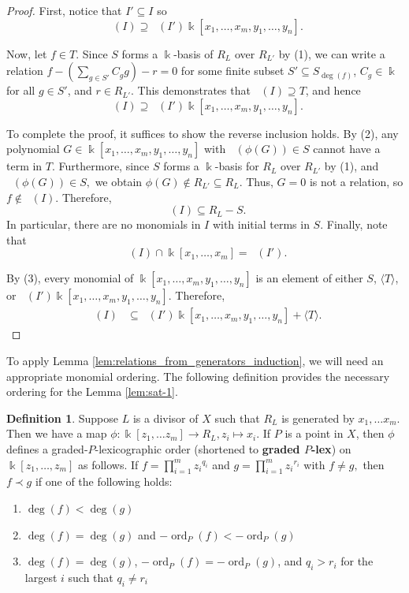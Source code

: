 \documentclass{amsart}
\theoremstyle{plain}
\theoremstyle{definition}
\newtheorem{defn}[thm]{Definition}
\theoremstyle{remark}
\numberwithin{equation}{section}
\newcommand\Bk{{\Bbbk}}
\DeclareMathOperator{\ord}{ord}
\newcommand{\halfcan}{L}
\DeclareMathOperator{\initial}{in_\prec}
\begin{document}
\begin{proof}
First, notice that $I'\subseteq I$ so 
\[
	\initial(I)\supseteq \initial(I')\Bk[x_1, \ldots, x_m, y_1, \ldots, y_n].
\]

Now, let $f\in T$.  Since $S$ forms a $\Bk$-basis of $R_{\halfcan}$ over $R_{\halfcan'}$ by (1), we can write a relation $f - (\sum_{g\in S'} C_g g)-r=0$ for some finite subset $S'\subseteq S_{\deg(f)}$, $C_g\in \Bk$ for all $g\in S'$, and $r\in R_{\halfcan'}$.  This demonstrates that $\initial(I) \supseteq T$, and hence
\[
	\initial(I)\supseteq \initial(I')\Bk[x_1, \ldots, x_m, y_1, \ldots, y_n].
\]

To complete the proof, it suffices to show the reverse inclusion holds. By (2), any polynomial $G\in \Bk[x_1, \ldots, x_m, y_1, \ldots, y_n]$ with $\initial(\phi(G)) \in S$ cannot have a term in $T$.  Furthermore, since $S$ forms a $\Bk$-basis for $R_\halfcan$ over $R_{\halfcan'}$ by (1), and $\initial(\phi(G)) \in S,$ we obtain $\phi(G) \notin R_{\halfcan'} \subseteq R_\halfcan.$ Thus, $G=0$ is not a relation, so $f\not\in \initial(I)$.  Therefore, 
\[
	\initial(I)\subseteq R_\halfcan-S.
\]
In particular, there are no monomials in $I$ with initial terms in $S$.
Finally, note that
\[
	\initial(I) \cap \Bk[x_1, \ldots, x_m] = \initial(I').
\]

By (3), every monomial of $\Bk[x_1, \ldots, x_m, y_1, \ldots, y_n]$ is an element of either $S$, $\langle T\rangle$, or $\initial(I') \Bk[x_1, \ldots, x_m, y_1, \ldots, y_n].$ Therefore,
\begin{align*}
	\initial(I) & \subseteq \initial(I') \Bk[x_1, \ldots, x_m, y_1, \ldots, y_n] + \langle T \rangle.
\end{align*}
\end{proof}

To apply Lemma \ref{lem:relations_from_generators_induction}, we will need an appropriate monomial ordering.
The following definition provides the necessary ordering for the Lemma \ref{lem:sat-1}.
\begin{defn}
\label{defn:graded-p-lex}
Suppose $\halfcan$ is a divisor of $X$ such that $R_\halfcan$ is generated by $x_1, \ldots x_m$.  Then we have a map $\phi: \Bk[z_1, \ldots z_m] \rightarrow R_\halfcan, z_i\mapsto x_i$. If $P$ is a point in $X$, then $\phi$ defines a graded-$P$-lexicographic order (shortened to {\bf{graded $P$-lex}}) on $\Bk[z_1, \ldots, z_m]$ as follows.
If $f=\prod_{i=1}^m {z_i}^{q_i}$ and $g=\prod_{i=1}^m {z_i}^{r_i}$ with $f \neq g,$ then $f\prec g$ if one of the following holds:
\begin{enumerate}
\item $\deg(f) < \deg(g)$
\item $\deg(f) = \deg(g)$ and $-\ord_P(f) < -\ord_P(g)$
\item $\deg(f) = \deg(g)$, $-\ord_P(f) = -\ord_P(g)$, and $q_i > r_i$ for the largest $i$ such that $q_i\ne r_i$
\end{enumerate}
\end{defn}
\end{document}
